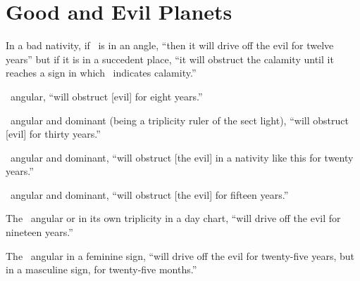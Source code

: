 \section{Good and Evil Planets}
In a bad nativity, if \Jupiter\, is in an angle, ``then it will drive off the evil for twelve years'' but if it is in a succedent place, ``it will obstruct  the calamity until it reaches a sign in which \Jupiter\, indicates calamity.''

\Venus\, angular, ``will obstruct [evil] for eight years.''

\Saturn\, angular and dominant (being a triplicity ruler of the sect light), ``will obstruct [evil] for thirty years.''

\Mercury\, angular and dominant, ``will obstruct [the evil] in a nativity like this for twenty years.''

\Mars\, angular and dominant, ``will obstruct [the evil] for fifteen years.''

The \Sun\, angular or in its own triplicity in a day chart, ``will drive off the evil for nineteen years.''

The \Moon\, angular in a feminine sign, ``will drive off the evil for twenty-five years, but in a masculine sign, for twenty-five months.''
